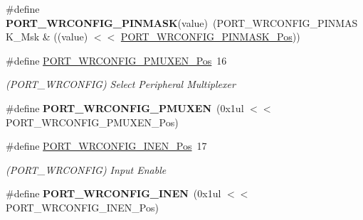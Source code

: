 \begin{DoxyCompactItemize}
\item 
\hypertarget{group___s_a_m_l21___p_o_r_t_ga434339fe8cb966a1a3f96d1904e799a6}{}\#define {\bfseries P\+O\+R\+T\+\_\+\+W\+R\+C\+O\+N\+F\+I\+G\+\_\+\+P\+I\+N\+M\+A\+S\+K}(value)~(P\+O\+R\+T\+\_\+\+W\+R\+C\+O\+N\+F\+I\+G\+\_\+\+P\+I\+N\+M\+A\+S\+K\+\_\+\+Msk \& ((value) $<$$<$ \hyperlink{group___s_a_m_l21___p_o_r_t_gab1a78a8f36fb7fceed5ec4b2f821670e}{P\+O\+R\+T\+\_\+\+W\+R\+C\+O\+N\+F\+I\+G\+\_\+\+P\+I\+N\+M\+A\+S\+K\+\_\+\+Pos}))\label{group___s_a_m_l21___p_o_r_t_ga434339fe8cb966a1a3f96d1904e799a6}

\item 
\hypertarget{group___s_a_m_l21___p_o_r_t_gaafa832687961ca48e5dacadda81a6371}{}\#define \hyperlink{group___s_a_m_l21___p_o_r_t_gaafa832687961ca48e5dacadda81a6371}{P\+O\+R\+T\+\_\+\+W\+R\+C\+O\+N\+F\+I\+G\+\_\+\+P\+M\+U\+X\+E\+N\+\_\+\+Pos}~16\label{group___s_a_m_l21___p_o_r_t_gaafa832687961ca48e5dacadda81a6371}

\begin{DoxyCompactList}\small\item\em (P\+O\+R\+T\+\_\+\+W\+R\+C\+O\+N\+F\+I\+G) Select Peripheral Multiplexer \end{DoxyCompactList}\item 
\hypertarget{group___s_a_m_l21___p_o_r_t_ga6ab07d485a3b9379cf529664d618e768}{}\#define {\bfseries P\+O\+R\+T\+\_\+\+W\+R\+C\+O\+N\+F\+I\+G\+\_\+\+P\+M\+U\+X\+E\+N}~(0x1ul $<$$<$ P\+O\+R\+T\+\_\+\+W\+R\+C\+O\+N\+F\+I\+G\+\_\+\+P\+M\+U\+X\+E\+N\+\_\+\+Pos)\label{group___s_a_m_l21___p_o_r_t_ga6ab07d485a3b9379cf529664d618e768}

\item 
\hypertarget{group___s_a_m_l21___p_o_r_t_ga54ebbb830cf16e6a9fc18bbc5879684a}{}\#define \hyperlink{group___s_a_m_l21___p_o_r_t_ga54ebbb830cf16e6a9fc18bbc5879684a}{P\+O\+R\+T\+\_\+\+W\+R\+C\+O\+N\+F\+I\+G\+\_\+\+I\+N\+E\+N\+\_\+\+Pos}~17\label{group___s_a_m_l21___p_o_r_t_ga54ebbb830cf16e6a9fc18bbc5879684a}

\begin{DoxyCompactList}\small\item\em (P\+O\+R\+T\+\_\+\+W\+R\+C\+O\+N\+F\+I\+G) Input Enable \end{DoxyCompactList}\item 
\hypertarget{group___s_a_m_l21___p_o_r_t_gadd5762cfb19c27a0831497111b8bf99f}{}\#define {\bfseries P\+O\+R\+T\+\_\+\+W\+R\+C\+O\+N\+F\+I\+G\+\_\+\+I\+N\+E\+N}~(0x1ul $<$$<$ P\+O\+R\+T\+\_\+\+W\+R\+C\+O\+N\+F\+I\+G\+\_\+\+I\+N\+E\+N\+\_\+\+Pos)\label{group___s_a_m_l21___p_o_r_t_gadd5762cfb19c27a0831497111b8bf99f}


\end{DoxyCompactItemize}
